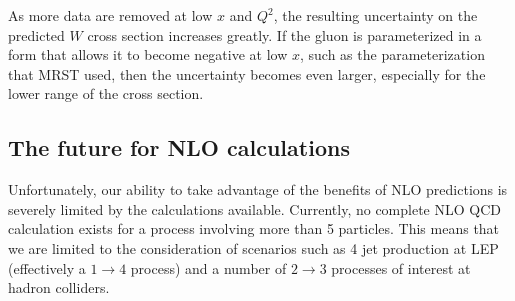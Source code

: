 \documentclass[12pt]{iopart}
\begin{document}
%
As more data are removed at low $x$ and $Q^2$, the resulting uncertainty on  the predicted $W$ cross section
increases greatly. If the gluon is parameterized in a form that allows it to become  negative at low $x$, such
as the parameterization that MRST used, then the uncertainty becomes even  larger, especially for the lower
range of the cross section. 

%
%

%
%

\subsection{The future for NLO calculations}
\label{sec:future}

Unfortunately, our ability to take advantage of the benefits of NLO predictions 
is severely limited by the calculations available. Currently, no complete NLO QCD
calculation exists for a process involving more than 5 particles. This means
that we are limited to the consideration of scenarios such as 4 jet production
at LEP (effectively a $1 \to 4$ process) and a number of $2 \to 3$ processes of
interest at hadron colliders.
\end{document}
